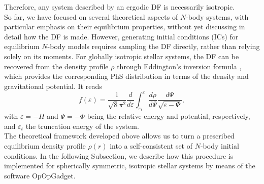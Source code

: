 \documentclass[12pt,twoside,openany]{book}
\begin{document}
Therefore, any system described by an ergodic DF is necessarily isotropic.\\So far, we have focused on several theoretical aspects of $N$-body systems, with particular emphasis on their equilibrium properties, without yet discussing in detail how the DF is made. However, generating initial conditions (ICs) for equilibrium $N$-body models requires sampling the DF directly, rather than relying solely on its moments. For
 globally isotropic stellar systems, the DF can be recovered from the density profile $\rho$ through Eddington's inversion formula \parencite{Eddington_1916}, which provides the corresponding PhS distribution in terms of the density and gravitational potential. It reads
\begin{equation}\label{Eddington's formula}
f(\varepsilon)=\frac{1}{\sqrt{8}\pi^2}\frac{d}{d\varepsilon}
\int_{\varepsilon_t}^{\varepsilon}
\frac{d\rho}{d\Psi}\frac{d\Psi}{\sqrt{\varepsilon-\Psi}},
\end{equation}
with $\varepsilon=-H$ and $\Psi=-\Phi$ being the relative energy and potential, respectively, and $\varepsilon_t$ the truncation energy of the system.\\The theoretical framework developed above allows us to turn a prescribed equilibrium density profile $\rho(r)$ into a self-consistent set of $N$-body initial conditions. In the following Subsection, we describe how this procedure is implemented for spherically symmetric, isotropic stellar systems by means of the software OpOpGadget.
\end{document}

